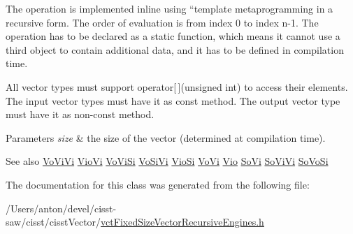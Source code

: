 The operation is implemented inline using ``template metaprogramming\textquotesingle{}\textquotesingle{} in a recursive form. The order of evaluation is from index 0 to index n-\/1. The operation has to be declared as a static function, which means it cannot use a third object to contain additional data, and it has to be defined in compilation time.

All vector types must support operator\mbox{[}$\,$\mbox{]}(unsigned int) to access their elements. The input vector types must have it as const method. The output vector type must have it as non-\/const method.


\begin{DoxyParams}{Parameters}
{\em size} & the size of the vector (determined at compilation time).\\
\hline
\end{DoxyParams}
\begin{DoxySeeAlso}{See also}
\hyperlink{classvct_fixed_size_vector_recursive_engines_1_1_vo_vi_vi}{Vo\+Vi\+Vi} \hyperlink{classvct_fixed_size_vector_recursive_engines_1_1_vio_vi}{Vio\+Vi} \hyperlink{classvct_fixed_size_vector_recursive_engines_1_1_vo_vi_si}{Vo\+Vi\+Si} \hyperlink{classvct_fixed_size_vector_recursive_engines_1_1_vo_si_vi}{Vo\+Si\+Vi} \hyperlink{classvct_fixed_size_vector_recursive_engines_1_1_vio_si}{Vio\+Si} \hyperlink{classvct_fixed_size_vector_recursive_engines_1_1_vo_vi}{Vo\+Vi} \hyperlink{classvct_fixed_size_vector_recursive_engines_1_1_vio}{Vio} \hyperlink{classvct_fixed_size_vector_recursive_engines_1_1_so_vi}{So\+Vi} \hyperlink{classvct_fixed_size_vector_recursive_engines_1_1_so_vi_vi}{So\+Vi\+Vi} \hyperlink{classvct_fixed_size_vector_recursive_engines_1_1_so_vo_si}{So\+Vo\+Si} 
\end{DoxySeeAlso}


The documentation for this class was generated from the following file\+:\begin{DoxyCompactItemize}
\item 
/\+Users/anton/devel/cisst-\/saw/cisst/cisst\+Vector/\hyperlink{vct_fixed_size_vector_recursive_engines_8h}{vct\+Fixed\+Size\+Vector\+Recursive\+Engines.\+h}\end{DoxyCompactItemize}
